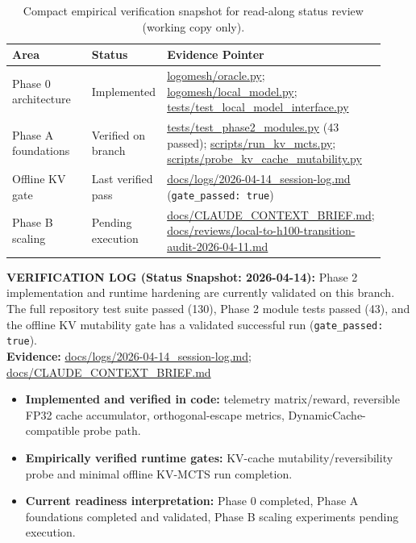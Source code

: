 \documentclass[10pt]{article}
\newcommand{\verifybox}[3]{%
\vspace{0.6em}
\noindent\colorbox{yellow!20}{%
\parbox{\dimexpr\linewidth-2\fboxsep\relax}{%
\textbf{VERIFICATION LOG (#1):} #2\\
\textbf{Evidence:} #3
}}%
\vspace{0.6em}
}
\begin{document}
\begin{table}[h]
\centering
\small
\begin{tabular}{@{}p{0.22\linewidth}p{0.18\linewidth}p{0.52\linewidth}@{}}
\toprule
\textbf{Area} & \textbf{Status} & \textbf{Evidence Pointer} \\
\midrule
Phase 0 architecture & Implemented & \url{logomesh/oracle.py}; \url{logomesh/local_model.py}; \url{tests/test_local_model_interface.py} \\
Phase A foundations & Verified on branch & \url{tests/test_phase2_modules.py} (43 passed); \url{scripts/run_kv_mcts.py}; \url{scripts/probe_kv_cache_mutability.py} \\
Offline KV gate & Last verified pass & \url{docs/logs/2026-04-14_session-log.md} (\texttt{gate\_passed: true}) \\
Phase B scaling & Pending execution & \url{docs/CLAUDE_CONTEXT_BRIEF.md}; \url{docs/reviews/local-to-h100-transition-audit-2026-04-11.md} \\
\bottomrule
\end{tabular}
\caption{Compact empirical verification snapshot for read-along status review (working copy only).}
\label{tab:verification_snapshot_compact}
\end{table}

\verifybox
{Status Snapshot: 2026-04-14}
{Phase 2 implementation and runtime hardening are currently validated on this branch. The full repository test suite passed (130), Phase 2 module tests passed (43), and the offline KV mutability gate has a validated successful run (\texttt{gate\_passed: true}).}
{\url{docs/logs/2026-04-14_session-log.md}; \url{docs/CLAUDE_CONTEXT_BRIEF.md}}

\begin{itemize}[leftmargin=*]
    \item \textbf{Implemented and verified in code:} telemetry matrix/reward, reversible FP32 cache accumulator, orthogonal-escape metrics, DynamicCache-compatible probe path.
    \item \textbf{Empirically verified runtime gates:} KV-cache mutability/reversibility probe and minimal offline KV-MCTS run completion.
    \item \textbf{Current readiness interpretation:} Phase 0 completed, Phase A foundations completed and validated, Phase B scaling experiments pending execution.
\end{itemize}

\end{document}
